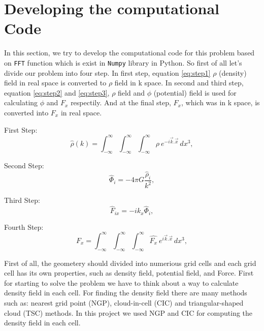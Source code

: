 \documentclass[10pt]{article}
\begin{document}
\section{Developing the computational Code}

In this section, we try to develop the computational code for this problem based on \texttt{FFT} function which is exist in \texttt{Numpy} library in Python. So first of all let's divide our problem into four step. In first step, equation \ref{eq:step1} $\rho$ (density) field in real space is converted to $\rho$ field in k space. In second and third step, equation \ref{eq:step2} and \ref{eq:step3}, $\rho$ field and $\phi$ (potential) field is used for calculating $\phi$ and $F_x$ respectily. And at the final step, $F_x$, which was in k space, is converted into $F_x$ in real space.    

First Step:\\

\begin{equation} \label{eq:step1}
    \hat{\rho}(k) = \int_{-\infty}^{\infty} \int_{-\infty}^{\infty} \int_{-\infty}^{\infty} \rho\ e^{- i \vec{k} . \vec{x}}\,dx^3,
\end{equation}
 
Second Step:\\

\begin{equation} \label{eq:step2}
    \hat{\Phi}_i= - 4\pi G\frac{\hat{\rho}_i}{k^2},
\end{equation}

Third Step:\\

\begin{equation} \label{eq:step3}
    \hat{F}_{ix} = - i k_x \hat{\Phi}_i,
\end{equation}

Fourth Step: \\

\begin{equation} \label{eq:step4}
    F_x = \int_{-\infty}^{\infty} \int_{-\infty}^{\infty} \int_{-\infty}^{\infty} \hat{F_x}\ e^{ i \vec{k} . \vec{x}}\,dx^3,
\end{equation}

First of all, the geometery should divided into numerious grid cells and each grid cell has its own properties, such as density field, potential field, and Force. First for starting to solve the problem we have to think about a way to calculate density field in each cell. For finding the density field there are many methods such as: nearest grid point (NGP), cloud-in-cell (CIC) and triangular-shaped cloud (TSC) methods. In this project we used NGP and CIC for computing the density field in each cell.\\
\end{document}
